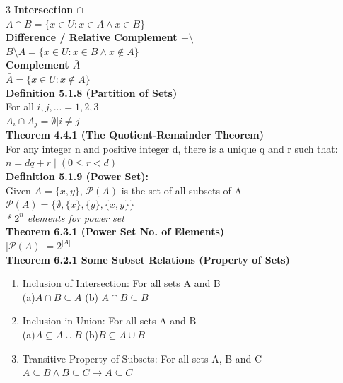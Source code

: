 \documentclass[10pt,landscape]{article}
\begin{document}
\begin{multicols}{3}
    \textbf{Intersection $\cap$} \\
    $A \cap B = \{ x \in U : x \in A \land x \in B \}$ \\
    \textbf{Difference / Relative Complement $- \setminus$} \\
    $B \setminus A = \{ x \in U : x \in B \land x \notin A \}$ \\
    \textbf{Complement $\bar{A}$} \\
    $\bar{A} = \{ x \in U : x \notin A \}$ \\
    \textbf{Definition 5.1.8 (Partition of Sets)} \\
    For all $i, j, ... = 1, 2, 3$ \\
    $A_i \cap A_j = \emptyset | i \neq j$ \\
    \textbf{Theorem 4.4.1 (The Quotient-Remainder Theorem)} \\
    For any integer n and positive integer d, there is a unique q and r such that:\\
    $n = dq + r \; | \; (0 \leq r < d)$ \\
    \textbf{Definition 5.1.9 (Power Set):} \\
    Given $A = \{ x, y \}$,
    $\mathcal{P}(A)$ is the set of all subsets of A \\
    $\mathcal{P}(A) = \{ \emptyset, \{ x \}, \{ y \}, \{ x, y \} \}$ \\
    \textit{* $2^n$ elements for power set} \\
    \textbf{Theorem 6.3.1 (Power Set No. of Elements)} \\
    $|\mathcal{P}(A)| = 2^{|A|}$ \\
    \textbf{Theorem 6.2.1 Some Subset Relations (Property of Sets)} \\
    \begin{enumerate}
        \item Inclusion of Intersection: For all sets A and B \\
              (a)$A \cap B \subseteq A$ (b) $A \cap B \subseteq B$
        \item Inclusion in Union: For all sets A and B \\
              (a)$A \subseteq A \cup B$ (b)$B \subseteq A \cup B$
        \item Transitive Property of Subsets: For all sets A, B and C \\
              $A \subseteq B \land B \subseteq C \rightarrow A \subseteq C$
    \end{enumerate}
    \begin{mdframed}

\end{mdframed}
\end{multicols}
\end{document}
